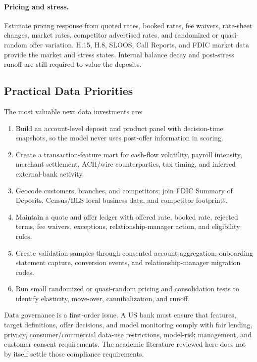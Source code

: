 \documentclass[11pt]{article}
\begin{document}
\paragraph{Pricing and stress.}
Estimate pricing response from quoted rates, booked rates, fee waivers,
rate-sheet changes, market rates, competitor advertised rates, and randomized
or quasi-random offer variation. H.15, H.8, SLOOS, Call Reports, and FDIC market
data provide the market and stress states. Internal balance decay and
post-stress runoff are still required to value the deposits.

\subsection{Practical Data Priorities}

The most valuable next data investments are:
\begin{enumerate}[leftmargin=*]
  \item Build an account-level deposit and product panel with decision-time
  snapshots, so the model never uses post-offer information in scoring.
  \item Create a transaction-feature mart for cash-flow volatility, payroll
  intensity, merchant settlement, ACH/wire counterparties, tax timing, and
  inferred external-bank activity.
  \item Geocode customers, branches, and competitors; join FDIC Summary of
  Deposits, Census/BLS local business data, and competitor footprints.
  \item Maintain a quote and offer ledger with offered rate, booked rate,
  rejected terms, fee waivers, exceptions, relationship-manager action, and
  eligibility rules.
  \item Create validation samples through consented account aggregation,
  onboarding statement capture, conversion events, and relationship-manager
  migration codes.
  \item Run small randomized or quasi-random pricing and consolidation tests to
  identify elasticity, move-over, cannibalization, and runoff.
\end{enumerate}

Data governance is a first-order issue. A US bank must ensure that features,
target definitions, offer decisions, and model monitoring comply with fair
lending, privacy, consumer/commercial data-use restrictions, model-risk
management, and customer consent requirements. The academic literature reviewed
here does not by itself settle those compliance requirements.
\end{document}
